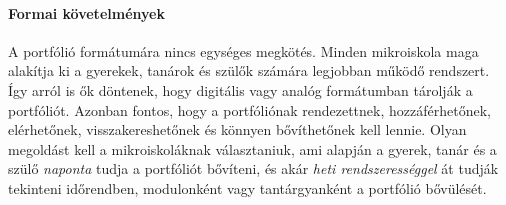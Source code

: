 \paragraph{Formai követelmények}
A portfólió formátumára nincs egységes megkötés. Minden mikroiskola maga
alakítja ki a gyerekek, tanárok és szülők számára legjobban működő rendszert.
Így arról is ők döntenek, hogy digitális vagy analóg formátumban tárolják a
portfóliót. Azonban fontos, hogy a portfóliónak rendezettnek, hozzáférhetőnek,
elérhetőnek, visszakereshetőnek és könnyen bővíthetőnek kell lennie. Olyan
megoldást kell a mikroiskoláknak választaniuk, ami alapján
a gyerek, tanár és a szülő \emph{naponta} tudja a portfóliót bővíteni, és akár
\emph{heti rendszerességgel} át tudják tekinteni időrendben, modulonként vagy
tantárgyanként a portfólió bővülését.
